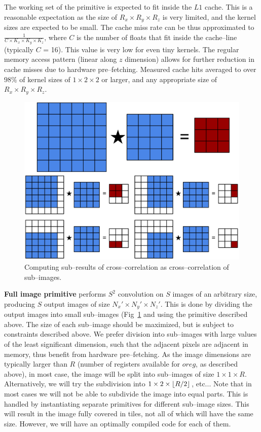   The working set of the primitive is expected to fit inside the $L1$
  cache.  This is a reasonable expectation as the size of $R_x \times
  R_y \times R_z$ is very limited, and the kernel sizes are expected
  to be small.  The cache miss rate can be thus approximated to
  $\frac{1}{C \times K_x \times K_y \times K_z}$, where $C$ is the
  number of floats that fit inside the cache--line (typically $C$ =
  16).  This value is very low for even tiny kernels.  The regular
  memory access pattern (linear along $z$ dimension) allows for
  further reduction in cache misses due to hardware pre--fetching.
  Measured cache hits averaged to over $98\%$ of kernel sizes of $1
  \times 2 \times 2$ or larger, and any appropriate size of $R_x
  \times R_y \times R_z$.

  \begin{figure}
    \begin{center}
      \includegraphics[width=0.57\linewidth]{fig/division}
    \end{center}
    \caption{Computing sub--results of cross--correlation as
      cross--correlation of sub--images.}
    \label{fig:conv-division}
  \end{figure}

  {\bf Full image primitive} performs $S^2$ convolution on $S$ images
  of an arbitrary size, producing $S$ output images of size $N_x'
  \times N_y' \times N_z'$.  This is done by dividing the output
  images into small sub--images (Fig~\ref{fig:conv-division} and using
  the primitive described above.  The size of each sub--image should
  be maximized, but is subject to constraints described above.  We
  prefer division into sub--images with large values of the least
  significant dimension, such that the adjacent pixels are adjacent in
  memory, thus benefit from hardware pre--fetching.  As the image
  dimensions are typically larger than $R$ (number of registers
  available for $oreg$, as described above), in most case, the image
  will be split into sub--images of size $1 \times 1 \times R$.
  Alternatively, we will try the subdivision into $1 \times 2 \times
  \lfloor R/2\rfloor$, etc...  Note that in most cases we will not be able to
  subdivide the image into equal parts.  This is handled by
  instantiating separate primitives for different sub--image sizes.
  This will result in the image fully covered in tiles, not all of
  which will have the same size.  However, we will have an optimally
  compiled code for each of them.

